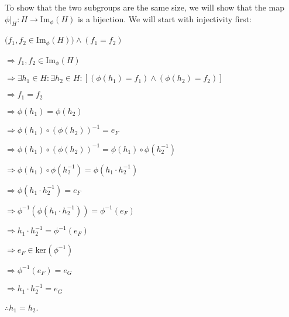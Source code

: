 \documentclass[12pt, a4paper]{article}
\begin{document}
\newpage

    To show that the two subgroups are the same size, we will show that the map $\phi|_{H}\colon H\rightarrow$Im$_{\phi}(H)$ is a bijection. We will start with injectivity first:\par
    
\vspace{4mm}

\hspace{2mm} $(f_1,f_2\in$Im$_{\phi}(H))\wedge(f_1=f_2)$\par
\vspace{2mm}
\hspace{10mm} $\Rightarrow f_1,f_2\in$Im$_{\phi}(H)$\par
\vspace{2mm}
\hspace{10mm} $\Rightarrow\exists h_1\in H\colon\exists h_2\in H\colon[(\phi(h_1)=f_1)\wedge(\phi(h_2)=f_2)]$\par
\vspace{2mm}
\hspace{10mm} $\Rightarrow f_1=f_2$\par
\vspace{2mm}
\hspace{10mm} $\Rightarrow\phi(h_1)=\phi(h_2)$\par
\vspace{2mm}
\hspace{10mm} $\Rightarrow\phi(h_1)\circ(\phi(h_2))^{-1}=e_F$\par
\vspace{2mm}
\hspace{10mm} $\Rightarrow\phi(h_1)\circ(\phi(h_2))^{-1}=\phi(h_1)\circ\phi(h^{-1}_2)$\par
\vspace{2mm}
\hspace{10mm} $\Rightarrow\phi(h_1)\circ\phi(h^{-1}_2)=\phi(h_1\cdot h^{-1}_2)$\par
\vspace{2mm}
\hspace{10mm} $\Rightarrow\phi(h_1\cdot h^{-1}_2)=e_F$\par
\vspace{2mm}
\hspace{10mm} $\Rightarrow\phi^{-1}(\phi(h_1\cdot h^{-1}_2))=\phi^{-1}(e_F)$\par
\vspace{2mm}
\hspace{10mm} $\Rightarrow h_1\cdot h^{-1}_2=\phi^{-1}(e_F)$\par
\vspace{2mm}
\hspace{10mm} $\Rightarrow e_F\in$ker$(\phi^{-1})$\par
\vspace{2mm}
\hspace{10mm} $\Rightarrow \phi^{-1}(e_F)=e_G$\par
\vspace{2mm}
\hspace{10mm} $\Rightarrow h_1\cdot h^{-1}_2=e_G$\par
\vspace{2mm}
\hspace{2mm} $\therefore h_1=h_2$.\par
\end{document}
